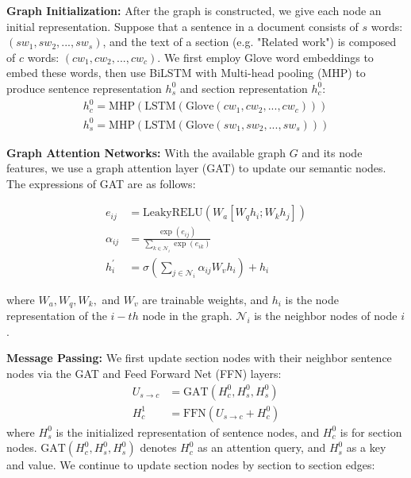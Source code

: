 \documentclass[11pt,a4paper]{article}
\begin{document}
\noindent \textbf{Graph Initialization:}
After the graph is constructed, we give each node an initial representation.
Suppose that  a sentence in a document consists of $s$ words: $(sw_1,sw_2,...,sw_s)$, and the text of a section (e.g. "Related work") is composed of $c$ words: $(cw_1,cw_2,...,cw_c)$.
We   first employ  Glove\cite{glove_2014} word embeddings to embed these words, then use BiLSTM \cite{lstm_1997} with Multi-head pooling (MHP) to produce sentence representation $h_s^0$ and section representation $h_c^0$:
\begin{align}
    h_c^0 = \text{MHP} (\text{LSTM} ( \text{Glove} (cw_1,cw_2,...,cw_c) ) ) \\
    h_s^0 = \text{MHP} (\text{LSTM} ( \text{Glove} (sw_1,sw_2,...,sw_s) ) )
\end{align}



\noindent \textbf{Graph Attention Networks:}
With the available graph $G$ and its node features, we use a graph attention layer (GAT) \cite{gat_2017} to update our semantic nodes. The expressions of GAT are as follows:

\begin{align}
    e_{ij} &= \text{LeakyRELU} (W_a[W_q h_i; W_k h_j]) \\
    \alpha_{ij} &= \frac{\exp (e_{ij})}{\sum_{k\in \mathcal{N}_i} \exp (e_{ik})} \\
    h_i^{\prime} &= \sigma (\sum_{j\in \mathcal{N}_i} \alpha_{ij} W_v h_i) + h_i
\end{align}

where $W_a, W_q, W_k,$ and $ W_v$ are trainable weights, and $h_i$ is the node representation of the $i-th$ node in the graph. $\mathcal{N}_i$ is the neighbor nodes of node $i$.

\noindent \textbf{Message Passing:} We first update section nodes with their neighbor sentence nodes via the GAT and Feed Forward Net (FFN) layers:
\begin{align}
    U_{s\rightarrow c} &= \text{GAT} ({H}_c^0, {H}_s^0, {H}_s^0) \\
    {H}_c^1 &= \text{FFN}(U_{s\rightarrow c} + {H}_c^0)
\end{align}
where ${H}_s^0$ is the initialized representation of sentence nodes, and ${H}_c^0$ is for section nodes.
 $\text{GAT} ({H}_c^0, {H}_s^0, {H}_s^0)$ denotes ${H}_c^0$ as an attention query, and ${H}_s^0$ as a key and value.
We continue to update section nodes by section to section edges:
\end{document}
